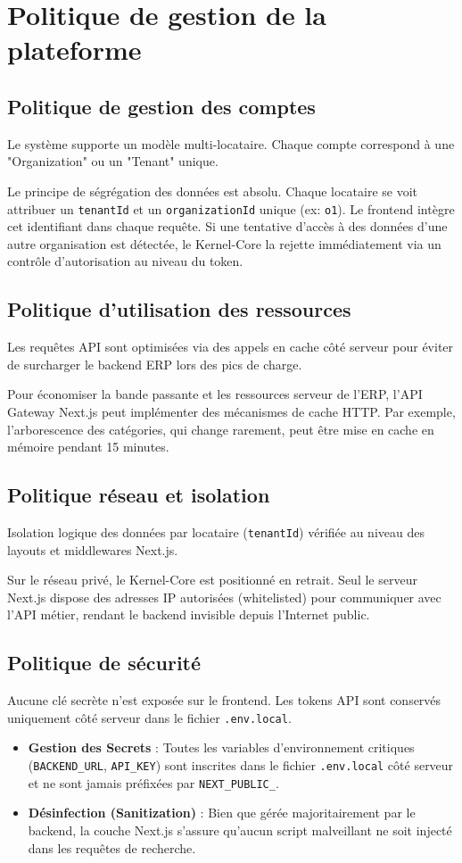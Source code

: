 \documentclass[12pt, a4paper]{report}
\begin{document}
\chapter{Politique de gestion de la plateforme}
\section{Politique de gestion des comptes}
Le système supporte un modèle multi-locataire. Chaque compte correspond à une "Organization" ou un "Tenant" unique.

Le principe de ségrégation des données est absolu. Chaque locataire se voit attribuer un \texttt{tenantId} et un \texttt{organizationId} unique (ex: \texttt{o1}). Le frontend intègre cet identifiant dans chaque requête. Si une tentative d'accès à des données d'une autre organisation est détectée, le Kernel-Core la rejette immédiatement via un contrôle d'autorisation au niveau du token.
\section{Politique d'utilisation des ressources}
Les requêtes API sont optimisées via des appels en cache côté serveur pour éviter de surcharger le backend ERP lors des pics de charge.

Pour économiser la bande passante et les ressources serveur de l'ERP, l'API Gateway Next.js peut implémenter des mécanismes de cache HTTP. Par exemple, l'arborescence des catégories, qui change rarement, peut être mise en cache en mémoire pendant 15 minutes.
\section{Politique réseau et isolation}
Isolation logique des données par locataire (\texttt{tenantId}) vérifiée au niveau des layouts et middlewares Next.js.

Sur le réseau privé, le Kernel-Core est positionné en retrait. Seul le serveur Next.js dispose des adresses IP autorisées (whitelisted) pour communiquer avec l'API métier, rendant le backend invisible depuis l'Internet public.
\section{Politique de sécurité}
Aucune clé secrète n'est exposée sur le frontend. Les tokens API sont conservés uniquement côté serveur dans le fichier \texttt{.env.local}.

\begin{itemize}
    \item \textbf{Gestion des Secrets} : Toutes les variables d'environnement critiques (\texttt{BACKEND\_URL}, \texttt{API\_KEY}) sont inscrites dans le fichier \texttt{.env.local} côté serveur et ne sont jamais préfixées par \texttt{NEXT\_PUBLIC\_}.
    \item \textbf{Désinfection (Sanitization)} : Bien que gérée majoritairement par le backend, la couche Next.js s'assure qu'aucun script malveillant ne soit injecté dans les requêtes de recherche.
\end{itemize}
\end{document}
